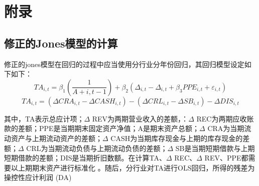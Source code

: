 \documentclass{article}
\begin{document}


\section{附录}
\subsection{修正的Jones模型的计算} %
\label{sub:修正的Jones模型的计算}
\par 修正的jones模型在回归的过程中应当使用分行业分年份回归，其回归模型设定如下如下：
\begin{equation}
    TA_{i,t} = \beta_1(\frac{1}{A+{i,t-1}}) + \beta_2(\Delta_{i,t}-\Delta_{i,t}+\beta_3 PPE_{i,t}+\varepsilon_{i,t})
\end{equation}
\begin{equation}
    TA_{i,t} = (\Delta CRA_{i,t}-\Delta CASH_{i,t})-(\Delta CRL_{i,t}-\Delta SB_{i,t}) -\Delta DIS_{i,t}
\end{equation}
\par 其中，TA表示总应计项；$\Delta $ REV为两期营业收入的差额，：$\Delta $ REC为两期应收账款的差额；PPE是当期期末固定资产净值；A是期末资产总额；$\Delta $ CRA为当期流动资产与上期流动资产的差额；$\Delta $ CASH为当期库存现金与上期的库存现金的差额；$\Delta $ CRL为当期流动负债与上期流动负债的差额；$\Delta $ SB是当期短期借款与上期短期借款的差额；DIS是当期折旧数额。在计算TA、$\Delta $ REC、$\Delta $ REV、PPE都需要以上期期末资产进行标准化 。随后，分行业对TA进行OLS回归，所得的残差为操控性应计利润 (DA)

\end{document}
